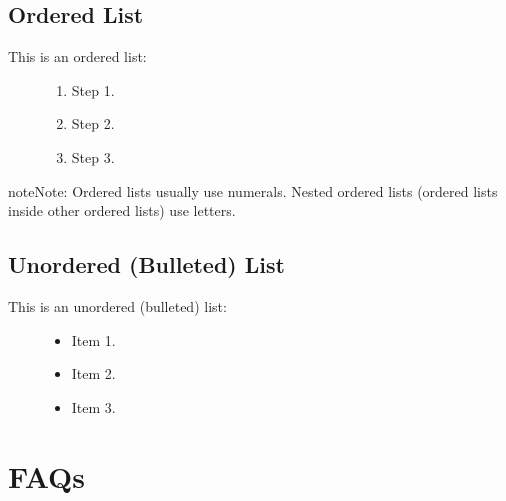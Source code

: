 \documentclass[letterpaper,10pt,english]{sphinxmanual}
\begin{document}
\section{Ordered List}
\label{\detokenize{topic4:ordered-list}}\begin{description}
\item[{This is an ordered list:}] \leavevmode\begin{enumerate}
%
\item {} 
\sphinxAtStartPar
Step 1.

\item {} 
\sphinxAtStartPar
Step 2.

\item {} 
\sphinxAtStartPar
Step 3.

\end{enumerate}

\end{description}

\begin{sphinxadmonition}{note}{Note:}
\sphinxAtStartPar
Ordered lists usually use numerals. Nested ordered lists (ordered lists inside other ordered lists) use letters.
\end{sphinxadmonition}


\section{Unordered (Bulleted) List}
\label{\detokenize{topic4:unordered-bulleted-list}}\begin{description}
\item[{This is an unordered (bulleted) list:}] \leavevmode\begin{itemize}
\item {} 
\sphinxAtStartPar
Item 1.

\item {} 
\sphinxAtStartPar
Item 2.

\item {} 
\sphinxAtStartPar
Item 3.

\end{itemize}

\end{description}

\sphinxstepscope


\chapter{FAQs}
\label{\detokenize{FAQs:faqs}}\label{\detokenize{FAQs::doc}}
\end{document}
